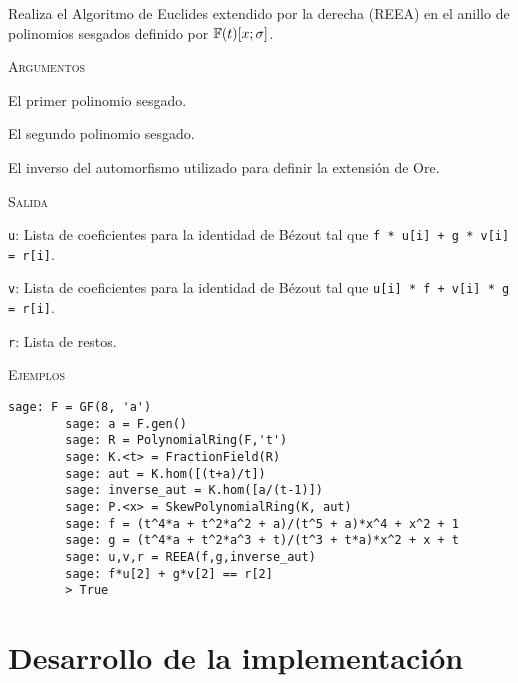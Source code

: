 \begin{description}[leftmargin=1em, font=\ttfamily, style=nextline]

    \item[REEA(f, g, inverse\_sigma)]
    
    Realiza el Algoritmo de Euclides extendido por la derecha (REEA) en el anillo de polinomios sesgados definido por $\mathbb{F}(t)[x;\sigma]$.

    \textsc{Argumentos}

    \begin{description}[font=\normalfont\ttfamily]
        \item[f] El primer polinomio sesgado.
        \item[g] El segundo polinomio sesgado.
        \item[inverse\_sigma] El inverso del automorfismo utilizado para definir la extensión de Ore.
    \end{description}

    \textsc{Salida}

    \begin{description}[font=\normalfont\ttfamily]
        \item[] \texttt{u}: Lista de coeficientes para la identidad de Bézout tal que \texttt{f * u[i] + g * v[i] = r[i]}.
        \item[]  \texttt{v}: Lista de coeficientes para la identidad de Bézout tal que \texttt{u[i] * f + v[i] * g = r[i]}.
        \item[] \texttt{r}: Lista de restos.
    \end{description}

    \textsc{Ejemplos}

    \begin{lstlisting}[gobble=8]
        sage: F = GF(8, 'a')
        sage: a = F.gen()
        sage: R = PolynomialRing(F,'t')
        sage: K.<t> = FractionField(R)
        sage: aut = K.hom([(t+a)/t])
        sage: inverse_aut = K.hom([a/(t-1)])
        sage: P.<x> = SkewPolynomialRing(K, aut)
        sage: f = (t^4*a + t^2*a^2 + a)/(t^5 + a)*x^4 + x^2 + 1
        sage: g = (t^4*a + t^2*a^3 + t)/(t^3 + t*a)*x^2 + x + t
        sage: u,v,r = REEA(f,g,inverse_aut)
        sage: f*u[2] + g*v[2] == r[2] 
        > True
    \end{lstlisting}  

\end{description}


\section{Desarrollo de la implementación}

